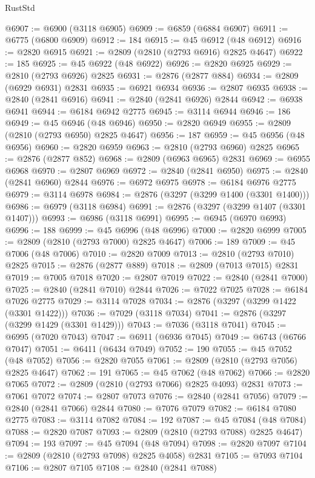 \begin{lexlean}{RustStd}
\begin{coremodule}
@6907 := @6900 (@3118 @6905)
@6909 := @6859 (@6884 @6907)
@6911 := @6775 (@6800 @6909)
@6912 := 184
@6915 := @45 @6912 (@48 @6912)
@6916 := @2820 @6915
@6921 := @2809 (@2810 (@2793 @6916) @2825 @4647)
@6922 := 185
@6925 := @45 @6922 (@48 @6922)
@6926 := @2820 @6925
@6929 := @2810 (@2793 @6926) @2825
@6931 := @2876 (@2877 @884)
@6934 := @2809 (@6929 @6931) @2831
@6935 := @6921 @6934
@6936 := @2807 @6935
@6938 := @2840 (@2841 @6916)
@6941 := @2840 (@2841 @6926) @2844
@6942 := @6938 @6941
@6944 := @6184 @6942 @2775
@6945 := @3114 @6944
@6946 := 186
@6949 := @45 @6946 (@48 @6946)
@6950 := @2820 @6949
@6955 := @2809 (@2810 (@2793 @6950) @2825 @4647)
@6956 := 187
@6959 := @45 @6956 (@48 @6956)
@6960 := @2820 @6959
@6963 := @2810 (@2793 @6960) @2825
@6965 := @2876 (@2877 @852)
@6968 := @2809 (@6963 @6965) @2831
@6969 := @6955 @6968
@6970 := @2807 @6969
@6972 := @2840 (@2841 @6950)
@6975 := @2840 (@2841 @6960) @2844
@6976 := @6972 @6975
@6978 := @6184 @6976 @2775
@6979 := @3114 @6978
@6984 := @2876 (@3297 (@3299 @1400 (@3301 @1400)))
@6986 := @6979 (@3118 @6984)
@6991 := @2876 (@3297 (@3299 @1407 (@3301 @1407)))
@6993 := @6986 (@3118 @6991)
@6995 := @6945 (@6970 @6993)
@6996 := 188
@6999 := @45 @6996 (@48 @6996)
@7000 := @2820 @6999
@7005 := @2809 (@2810 (@2793 @7000) @2825 @4647)
@7006 := 189
@7009 := @45 @7006 (@48 @7006)
@7010 := @2820 @7009
@7013 := @2810 (@2793 @7010) @2825
@7015 := @2876 (@2877 @889)
@7018 := @2809 (@7013 @7015) @2831
@7019 := @7005 @7018
@7020 := @2807 @7019
@7022 := @2840 (@2841 @7000)
@7025 := @2840 (@2841 @7010) @2844
@7026 := @7022 @7025
@7028 := @6184 @7026 @2775
@7029 := @3114 @7028
@7034 := @2876 (@3297 (@3299 @1422 (@3301 @1422)))
@7036 := @7029 (@3118 @7034)
@7041 := @2876 (@3297 (@3299 @1429 (@3301 @1429)))
@7043 := @7036 (@3118 @7041)
@7045 := @6995 (@7020 @7043)
@7047 := @6911 (@6936 @7045)
@7049 := @6743 (@6766 @7047)
@7051 := @6411 (@6434 @7049)
@7052 := 190
@7055 := @45 @7052 (@48 @7052)
@7056 := @2820 @7055
@7061 := @2809 (@2810 (@2793 @7056) @2825 @4647)
@7062 := 191
@7065 := @45 @7062 (@48 @7062)
@7066 := @2820 @7065
@7072 := @2809 (@2810 (@2793 @7066) @2825 @4093) @2831
@7073 := @7061 @7072
@7074 := @2807 @7073
@7076 := @2840 (@2841 @7056)
@7079 := @2840 (@2841 @7066) @2844
@7080 := @7076 @7079
@7082 := @6184 @7080 @2775
@7083 := @3114 @7082
@7084 := 192
@7087 := @45 @7084 (@48 @7084)
@7088 := @2820 @7087
@7093 := @2809 (@2810 (@2793 @7088) @2825 @4647)
@7094 := 193
@7097 := @45 @7094 (@48 @7094)
@7098 := @2820 @7097
@7104 := @2809 (@2810 (@2793 @7098) @2825 @4058) @2831
@7105 := @7093 @7104
@7106 := @2807 @7105
@7108 := @2840 (@2841 @7088)

\end{coremodule}
\end{lexlean}

